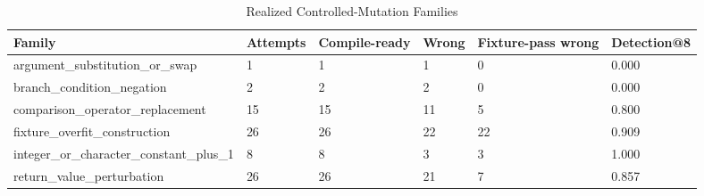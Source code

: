\begin{table}[t]
\centering
\small
\begin{tabular}{llllll}
\toprule
Family & Attempts & Compile-ready & Wrong & Fixture-pass wrong & Detection@8 \\
\midrule
argument\_substitution\_or\_swap & 1 & 1 & 1 & 0 & 0.000 \\
branch\_condition\_negation & 2 & 2 & 2 & 0 & 0.000 \\
comparison\_operator\_replacement & 15 & 15 & 11 & 5 & 0.800 \\
fixture\_overfit\_construction & 26 & 26 & 22 & 22 & 0.909 \\
integer\_or\_character\_constant\_plus\_1 & 8 & 8 & 3 & 3 & 1.000 \\
return\_value\_perturbation & 26 & 26 & 21 & 7 & 0.857 \\
\bottomrule
\end{tabular}
\caption{Realized Controlled-Mutation Families}
\end{table}
